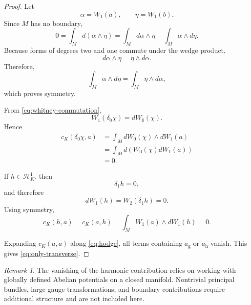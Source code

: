 \documentclass[11pt]{article}
\theoremstyle{definition}
\theoremstyle{remark}
\newtheorem{remark}[theorem]{Remark}
\begin{document}
\begin{proof}
Let
\begin{equation}
\alpha=W_1(a),
\qquad
\eta=W_1(b).
\end{equation}
Since \(M\) has no boundary,
\begin{equation}
0
=
\int_M d(\alpha\wedge\eta)
=
\int_M d\alpha\wedge\eta
-
\int_M\alpha\wedge d\eta.
\end{equation}
Because forms of degrees two and one commute under the wedge
product,
\begin{equation}
d\alpha\wedge\eta
=
\eta\wedge d\alpha.
\end{equation}
Therefore,
\begin{equation}
\int_M\alpha\wedge d\eta
=
\int_M\eta\wedge d\alpha,
\end{equation}
which proves symmetry.

From \eqref{eq:whitney-commutation},
\begin{equation}
W_1(\delta_0\chi)
=
dW_0(\chi).
\end{equation}
Hence
\begin{align}
c_K(\delta_0\chi,a)
&=
\int_M
dW_0(\chi)\wedge dW_1(a)
\nonumber\\
&=
\int_M
d\left(
W_0(\chi)dW_1(a)
\right)
\nonumber\\
&=
0.
\end{align}

If \(h\in\mathcal H_K^1\), then
\begin{equation}
\delta_1h=0,
\end{equation}
and therefore
\begin{equation}
dW_1(h)
=
W_2(\delta_1h)
=
0.
\end{equation}
Using symmetry,
\begin{equation}
c_K(h,a)
=
c_K(a,h)
=
\int_M
W_1(a)\wedge dW_1(h)
=
0.
\end{equation}

Expanding \(c_K(a,a)\) along \eqref{eq:hodge}, all terms
containing \(a_{\mathrm g}\) or \(a_{\mathrm h}\) vanish.
This gives \eqref{eq:only-transverse}.
\end{proof}

\begin{remark}
The vanishing of the harmonic contribution relies on working
with globally defined Abelian potentials on a closed
manifold. Nontrivial principal bundles, large gauge
transformations, and boundary contributions require additional
structure and are not included here.
\end{remark}
\end{document}

